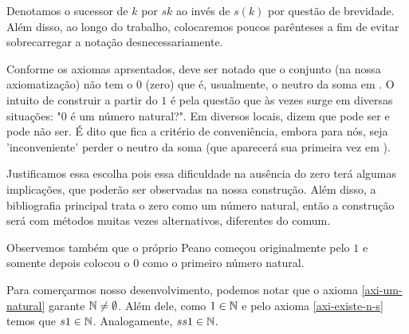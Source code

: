 \documentclass[../main.tex]{subfiles}
\begin{document}
Denotamos o sucessor de $k$ por $sk$ ao invés de $s(k)$ por questão de brevidade. Além disso, ao longo do trabalho, colocaremos poucos parênteses a fim de evitar sobrecarregar a notação desnecessariamente.

Conforme os axiomas aprsentados, deve ser notado que o conjunto \N (na nossa axiomatização) não tem o $0$ (zero) que é, usualmente, o neutro da soma em \N. O intuito de construir a partir do $1$ é pela questão que às vezes surge em diversas situações: "$0$ é um número natural?". Em diversos locais, dizem que pode ser e pode não ser. É dito que fica a critério de conveniência, embora para nós, seja 'inconveniente' perder o neutro da soma (que aparecerá sua primeira vez em \Z). 

Justificamos essa escolha pois essa dificuldade na ausência do zero terá algumas implicações, que poderão ser observadas na nossa construção. Além disso, a bibliografia principal trata o zero como um número natural, então a construção será com métodos muitas vezes alternativos, diferentes do comum.

Observemos também que o próprio Peano começou originalmente pelo $1$ e somente depois colocou o $0$ como o primeiro número natural.

Para comerçarmos nosso desenvolvimento, podemos notar que o axioma \ref{axi-um-natural} garante $\mathbb{N} \neq \emptyset $. Além dele, como $1 \in \mathbb{N}$ e pelo axioma \ref{axi-existe-n-s} temos que $s1 \in \mathbb{N}$. Analogamente, $ss1 \in \mathbb{N}$.
\end{document}
